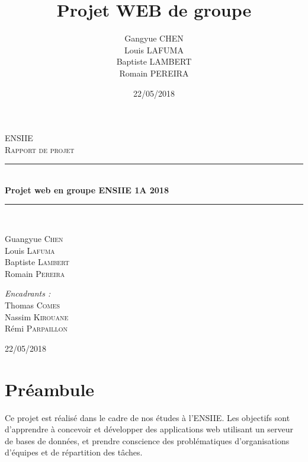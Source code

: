 \documentclass[10pt]{article}
\title{Projet WEB de groupe}
\author{
  Gangyue CHEN \\
  Louis LAFUMA \\
  Baptiste LAMBERT \\
  Romain PEREIRA
}
\date{22/05/2018}
\newcommand{\HRule}{\rule{\linewidth}{0.5mm}}
\begin{document}
  \begin{titlepage}
    \begin{sffamily}
      \begin{center}
	
	\textsc{\LARGE ENSIIE}\\[2cm]
	\textsc{\Large Rapport de projet}\\[1.5cm]
	\HRule \\[0.4cm]
	{ \huge \bfseries Projet web en groupe ENSIIE 1A 2018\\[0.4cm] }
	\HRule \\[2cm]
	
	\begin{minipage}{0.4\textwidth}
	  \begin{flushleft} \large
	    Guangyue \textsc{Chen}\\
	    Louis \textsc{Lafuma}\\
	    Baptiste \textsc{Lambert}\\
	    Romain \textsc{Pereira}\\
	  \end{flushleft}
	\end{minipage}
	\begin{minipage}{0.4\textwidth}
	  \begin{flushright} \large
	    \emph{Encadrants :} \\
	    Thomas \textsc{Comes}\\
	    Nassim \textsc{Kirouane}\\
	    Rémi \textsc{Parpaillon}\\
	  \end{flushright}
	\end{minipage}
	\vfill
	{\large 22/05/2018}
      \end{center}
    \end{sffamily}
  \end{titlepage}
  \maketitle
  \tableofcontents
  
  \section*{Préambule}
  Ce projet est réalisé dans le cadre de nos études à l'ENSIIE.
  Les objectifs sont d'apprendre à concevoir et développer des applications web utilisant un serveur de bases de données,
  et prendre conscience des problématiques d’organisations d’équipes et de répartition des tâches.
  
\end{document}
